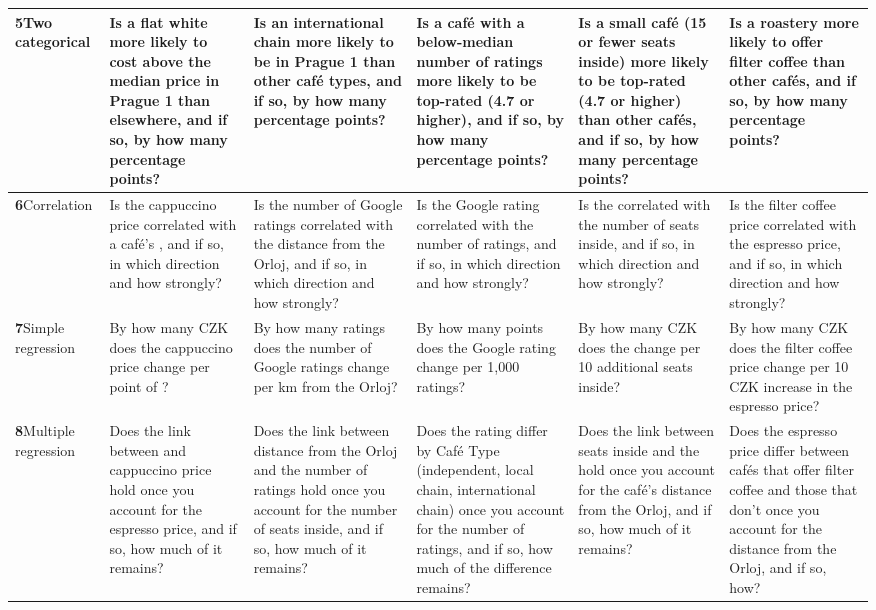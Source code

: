 \documentclass[11pt,a4paper]{article}
\begin{document}
\begin{landscape}
{\begin{longtable}{@{}>{\RaggedRight\arraybackslash}p{3.0cm}*{5}{>{\RaggedRight\arraybackslash}p{3.85cm}}@{}}
\midrule[\lightrulewidth]
\textbf{5}\enspace Two categorical & Is a flat white more likely to cost above the median price in Prague 1 than elsewhere, and if so, by how many percentage points? & Is an international chain more likely to be in Prague 1 than other caf\'e types, and if so, by how many percentage points? & Is a caf\'e with a below-median number of ratings more likely to be top-rated (4.7 or higher), and if so, by how many percentage points? & Is a small caf\'e (15 or fewer seats inside) more likely to be top-rated (4.7 or higher) than other caf\'es, and if so, by how many percentage points? & Is a roastery more likely to offer filter coffee than other caf\'es, and if so, by how many percentage points? \\
\midrule[\lightrulewidth]
\textbf{6}\enspace Correlation & Is the cappuccino price correlated with a caf\'e's \AR{}, and if so, in which direction and how strongly? & Is the number of Google ratings correlated with the distance from the Orloj, and if so, in which direction and how strongly? & Is the Google rating correlated with the number of ratings, and if so, in which direction and how strongly? & Is the \PL{} correlated with the number of seats inside, and if so, in which direction and how strongly? & Is the filter coffee price correlated with the espresso price, and if so, in which direction and how strongly? \\
\midrule[\lightrulewidth]
\textbf{7}\enspace Simple regression & By how many CZK does the cappuccino price change per point of \AR{}? & By how many ratings does the number of Google ratings change per km from the Orloj? & By how many points does the Google rating change per 1,000 ratings? & By how many CZK does the \PL{} change per 10 additional seats inside? & By how many CZK does the filter coffee price change per 10 CZK increase in the espresso price? \\
\midrule[\lightrulewidth]
\textbf{8}\enspace Multiple regression & Does the link between \AR{} and cappuccino price hold once you account for the espresso price, and if so, how much of it remains? & Does the link between distance from the Orloj and the number of ratings hold once you account for the number of seats inside, and if so, how much of it remains? & Does the rating differ by Caf\'e Type (independent, local chain, international chain) once you account for the number of ratings, and if so, how much of the difference remains? & Does the link between seats inside and the \PL{} hold once you account for the caf\'e's distance from the Orloj, and if so, how much of it remains? & Does the espresso price differ between caf\'es that offer filter coffee and those that don't once you account for the distance from the Orloj, and if so, how? \\

\end{longtable}}
\end{landscape}
\end{document}
